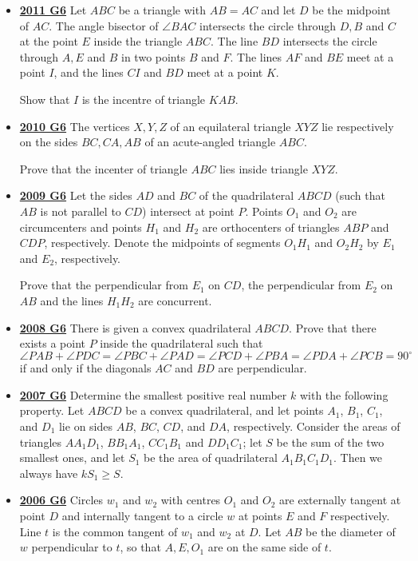 \documentclass[11pt]{scrartcl}
\begin{document}
\begin{itemize}[leftmargin=*]
Prove that $OP=OI$.
\item \href{https://artofproblemsolving.com/community/c6h488831p2739334}{\textbf{2011 G6}} Let $ABC$ be a triangle with $AB=AC$ and let $D$ be the midpoint of $AC$. The angle bisector of $\angle BAC$ intersects the circle through $D,B$ and $C$ at the point $E$ inside the triangle $ABC$. The line $BD$ intersects the circle through $A,E$ and $B$ in two points $B$ and $F$. The lines $AF$ and $BE$ meet at a point $I$, and the lines $CI$ and $BD$ meet at a point $K$. 

Show that $I$ is the incentre of triangle $KAB$.
\item \href{https://artofproblemsolving.com/community/c6h418636p2361979}{\textbf{2010 G6}} 	The vertices $X, Y , Z$ of an equilateral triangle $XYZ$ lie respectively on the sides $BC, CA, AB$ of an acute-angled triangle $ABC.$ 

Prove that the incenter of triangle $ABC$ lies inside triangle $XYZ$.

\newpage

\item \href{https://artofproblemsolving.com/community/c6h355793p1932938}{\textbf{2009 G6}} 	Let the sides $AD$ and $BC$ of the quadrilateral $ABCD$ (such that $AB$ is not parallel to $CD$) intersect at point $P$. Points $O_1$ and $O_2$ are circumcenters and points $H_1$ and $H_2$ are orthocenters of triangles $ABP$ and $CDP$, respectively. Denote the midpoints of segments $O_1H_1$ and $O_2H_2$ by $E_1$ and $E_2$, respectively. 

Prove that the perpendicular from $E_1$ on $CD$, the perpendicular from $E_2$ on $AB$ and the lines $H_1H_2$ are concurrent.
\item \href{https://artofproblemsolving.com/community/c6h287868p1555924}{\textbf{2008 G6}} There is given a convex quadrilateral $ ABCD$. Prove that there exists a point $ P$ inside the quadrilateral such that \[ \angle PAB + \angle PDC = \angle PBC + \angle PAD = \angle PCD + \angle PBA = \angle PDA + \angle PCB = 90^{\circ} \] if and only if the diagonals $ AC$ and $ BD$ are perpendicular.
\item \href{https://artofproblemsolving.com/community/c6h214651p1186813}{\textbf{2007 G6}} Determine the smallest positive real number $ k$ with the following property. Let $ ABCD$ be a convex quadrilateral, and let points $ A_1$, $ B_1$, $ C_1$, and $ D_1$ lie on sides $ AB$, $ BC$, $ CD$, and $ DA$, respectively. Consider the areas of triangles $ AA_1D_1$, $ BB_1A_1$, $ CC_1B_1$ and $ DD_1C_1$; let $ S$ be the sum of the two smallest ones, and let $ S_1$ be the area of quadrilateral $ A_1B_1C_1D_1$. Then we always have $ kS_1\geqslant S$.
\item \href{https://artofproblemsolving.com/community/c6h155710p875026}{\textbf{2006 G6}} Circles $ w_{1}$ and $ w_{2}$ with centres $ O_{1}$ and $ O_{2}$ are externally tangent at point $ D$ and internally tangent to a circle $ w$ at points $ E$ and $ F$ respectively. Line $ t$ is the common tangent of $ w_{1}$ and $ w_{2}$ at $ D$. Let $ AB$ be the diameter of $ w$ perpendicular to $ t$, so that $ A, E, O_{1}$ are on the same side of $ t$. 


\end{itemize}
\end{document}
